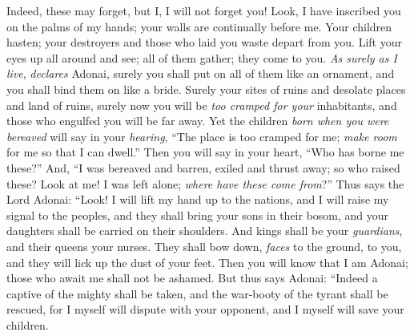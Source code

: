 \begin{biblechapter}
Indeed, these may forget, 
but I, I will not forget you!
\verse Look, I have inscribed you on the palms of my hands; 
your walls are continually before me.
\verse Your children hasten; 
your destroyers and those who laid you waste depart from you.
\verse Lift your eyes up all around and see; 
all of them gather; they come to you. 
\textit{As surely as I live}, 
\textit{declares} Adonai, 
surely you shall put on all of them like an ornament, 
and you shall bind them on like a bride.
\verse Surely your sites of ruins and desolate places and land of ruins, surely now you will be \textit{too cramped for your} inhabitants, 
and those who engulfed you will be far away.
\verse Yet the children \textit{born when you were bereaved} will say in your \textit{hearing}, “The place is too cramped for me; 
\textit{make room} for me so that I can dwell.”
\verse Then you will say in your heart, “Who has borne me these?” 
And, “I was bereaved and barren, 
exiled and thrust away; 
so who raised these? 
Look at me! I was left alone; 
\textit{where have these come from}?”
\verse Thus says the Lord Adonai:
\verse “Look! I will lift my hand up to the nations, 
and I will raise my signal to the peoples, 
and they shall bring your sons in their bosom, 
and your daughters shall be carried on their shoulders.
\verse And kings shall be your \textit{guardians}, 
and their queens your nurses. 
They shall bow down, \textit{faces} to the ground, to you, 
and they will lick up the dust of your feet. 
Then you will know that I am Adonai; 
those who await me shall not be ashamed.
\verse But thus says Adonai:
\verse “Indeed a captive of the mighty shall be taken, 
and the war-booty of the tyrant shall be rescued, 
for I myself will dispute with your opponent, 
and I myself will save your children.
\end{biblechapter}

